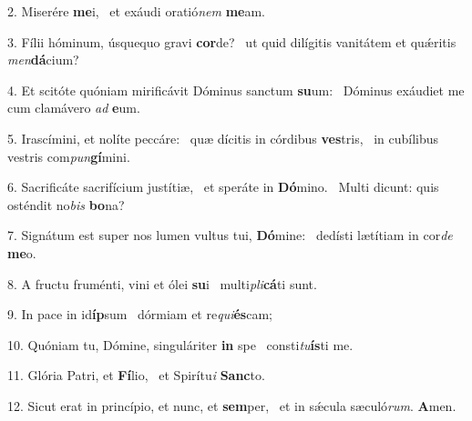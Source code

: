 2. Miserére \textbf{me}i, \ast\  et exáudi oratió\textit{nem} \textbf{me}am.\

3. Fílii hóminum, úsquequo gravi \textbf{cor}de? \ast\  ut quid dilígitis vanitátem et quǽritis \textit{men}\textbf{dá}cium?\

4. Et scitóte quóniam mirificávit Dóminus sanctum \textbf{su}um: \ast\  Dóminus exáudiet me cum clamávero \textit{ad} \textbf{e}um.\

5. Irascímini, et nolíte peccáre: \dag\  quæ dícitis in córdibus \textbf{ves}tris, \ast\  in cubílibus vestris com\textit{pun}\textbf{gí}mini.\

6. Sacrificáte sacrifícium justítiæ, \dag\  et speráte in \textbf{Dó}mino. \ast\  Multi dicunt: quis osténdit no\textit{bis} \textbf{bo}na?\

7. Signátum est super nos lumen vultus tui, \textbf{Dó}mine: \ast\  dedísti lætítiam in cor\textit{de} \textbf{me}o.\

8. A fructu fruménti, vini et ólei \textbf{su}i \ast\  multi\textit{pli}\textbf{cá}ti sunt.\

9. In pace in id\textbf{íp}sum \ast\  dórmiam et re\textit{qui}\textbf{és}cam;\

10. Quóniam tu, Dómine, singuláriter \textbf{in} spe \ast\  consti\textit{tu}\textbf{ís}ti me.\

11. Glória Patri, et \textbf{Fí}lio, \ast\  et Spirítu\textit{i} \textbf{Sanc}to.\

12. Sicut erat in princípio, et nunc, et \textbf{sem}per, \ast\  et in sǽcula sæculó\textit{rum}. \textbf{A}men.\

